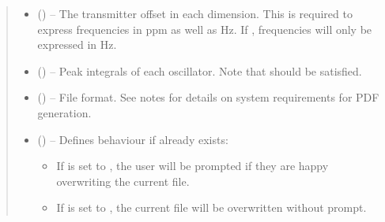 \documentclass[letterpaper,10pt,english]{sphinxmanual}
\begin{document}
\begin{fulllineitems}
\begin{quote}
\begin{description}
\begin{itemize}
\item {} 
\sphinxAtStartPar
{} (\sphinxstyleliteralemphasis{\sphinxupquote{{[}}}\sphinxstyleliteralemphasis{\sphinxupquote{{]}}}\sphinxstyleliteralemphasis{\sphinxupquote{, }}\sphinxstyleliteralemphasis{\sphinxupquote{{[}}}\sphinxstyleliteralemphasis{\sphinxupquote{, }}\sphinxstyleliteralemphasis{\sphinxupquote{{]} or }}) – The transmitter offset in each dimension. This is required to
express frequencies in ppm as well as Hz. If , frequencies
will only be expressed in Hz.

\item {} 
\sphinxAtStartPar
{} () – Peak integrals of each oscillator. Note that
 should be satisfied.

\item {} 
\sphinxAtStartPar
{} (\sphinxstyleliteralemphasis{\sphinxupquote{, }}\sphinxstyleliteralemphasis{\sphinxupquote{, }}) – File format. See notes for details on system requirements for PDF
generation.

\item {} 
\sphinxAtStartPar
{} () – 
\sphinxAtStartPar
Defines behaviour if  already exists:
\begin{itemize}
\item {} 
\sphinxAtStartPar
If  is set to , the user will be prompted
if they are happy overwriting the current file.

\item {} 
\sphinxAtStartPar
If  is set to , the current file will be
overwritten without prompt.


\end{itemize}
\end{itemize}
\end{description}
\end{quote}
\end{fulllineitems}
\end{document}
